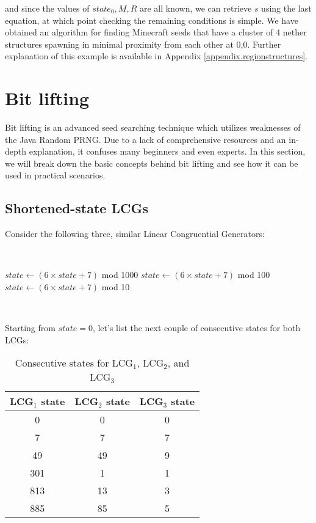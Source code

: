 \documentclass{article}
\begin{document}
and since the values of $state_0, M, R$ are all known, we can retrieve $s$ using the last equation, at which point checking the remaining conditions is simple. We have obtained an algorithm for finding Minecraft seeds that have a cluster of 4 nether structures spawning in minimal proximity from each other at 0,0. Further explanation of this example is available in Appendix \ref{appendix.regionstructures}. 


\section{Bit lifting}

Bit lifting is an advanced seed searching technique which utilizes weaknesses of the Java Random PRNG. Due to a lack of comprehensive resources and an in-depth explanation, it confuses many beginners and even experts. In this section, we will break down the basic concepts behind bit lifting and see how it can be used in practical scenarios.

\subsection{Shortened-state LCGs}

Consider the following three, similar Linear Congruential Generators:

\
\begin{algorithmic}
    \State $state \gets (6 \times state + 7)$ mod 1000
    \State $state \gets (6 \times state + 7)$ mod 100
    \State $state \gets (6 \times state + 7)$ mod 10
\end{algorithmic}
\ \

\noindent Starting from $state = 0$, let’s list the next couple of consecutive states for both LCGs:

\begin{table}[h]
    \centering
    \begin{tabular}{|c|c|c|}
    \hline
         LCG$_1$ state & LCG$_2$ state & LCG$_3$ state \\
    \hline
         0 & 0 & 0   \\
         7 & 7 & 7   \\
         49 & 49 & 9  \\
         301 & 1 & 1   \\
         813 & 13 & 3  \\
         885 & 85 & 5  \\
    \hline
    \end{tabular}
    \caption{Consecutive states for LCG$_1$, LCG$_2$, and LCG$_3$}
    \label{tab:lcgs}
\end{table}
\end{document}
